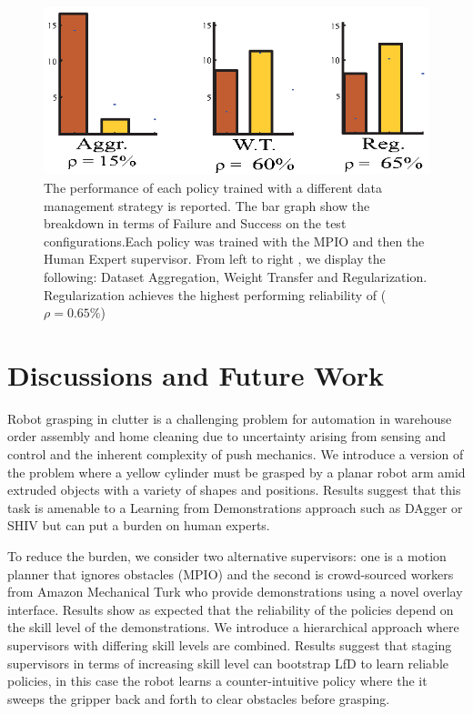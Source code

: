 \documentclass[10pt, conference]{ieeeconf}      %
\begin{document}
\begin{figure}[t]
\centering 
\includegraphics{f_figs/cost_result.eps}

\caption{\footnotesize The performance of each policy trained with a different data management strategy is reported. The
bar graph show the breakdown in terms of Failure and Success on the test configurations.Each policy was trained with the MPIO and then the Human Expert supervisor. From left to right , we display the following: Dataset Aggregation, Weight Transfer and Regularization. Regularization achieves the highest performing reliability of ($\rho = 0.65\%$) }

\label{fig:cost_result}
\vspace*{-22pt}
\end{figure}


\section{Discussions and Future Work}
Robot grasping in clutter is a challenging problem for automation in warehouse order assembly and home cleaning due to uncertainty arising from sensing and control and the inherent complexity of push mechanics. We introduce a version of the problem where a yellow cylinder must be grasped by a planar robot arm amid extruded objects with a variety of shapes and positions.  Results suggest that this task is amenable to a Learning from Demonstrations approach such as DAgger or SHIV but can put a burden on human experts.

To reduce the burden, we consider two alternative supervisors:  one is a motion planner that ignores obstacles (MPIO) and the second is crowd-sourced workers from Amazon Mechanical Turk who provide demonstrations using a novel overlay interface.  Results show as expected that the reliability of the policies depend on the skill level of the demonstrations.  We introduce a hierarchical approach where supervisors with differing skill levels are combined.  Results suggest that staging supervisors in terms of increasing skill level can bootstrap LfD to learn reliable policies, in this case the robot learns a counter-intuitive policy where the it sweeps the gripper back and forth to clear obstacles before grasping.
\end{document}
